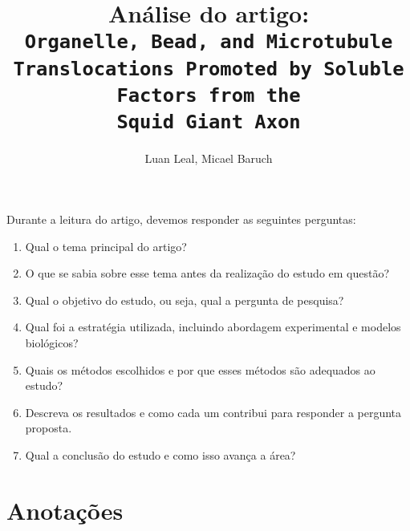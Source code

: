 \documentclass{article}
\author{Luan Leal, Micael Baruch}
\title{Análise do artigo:\\
    \texttt{Organelle, Bead, and Microtubule Translocations Promoted by Soluble Factors from the\\ Squid Giant Axon}
    }
\begin{document}
\maketitle

Durante a leitura do artigo, devemos responder as seguintes perguntas:
\begin{enumerate}
    \item Qual o tema principal do artigo?
    \item O que se sabia sobre esse tema antes da realização do estudo em questão? 
    \item Qual o objetivo do estudo, ou seja, qual a pergunta de pesquisa? 
    \item Qual foi a estratégia utilizada, incluindo abordagem experimental e modelos  biológicos? 
    \item Quais os métodos escolhidos e por que esses métodos são adequados ao estudo? 
    \item Descreva os resultados e como cada um contribui para responder a pergunta proposta.
    \item Qual a conclusão do estudo e como isso avança a área?  
\end{enumerate}

\section{Anotações}

\end{document}
